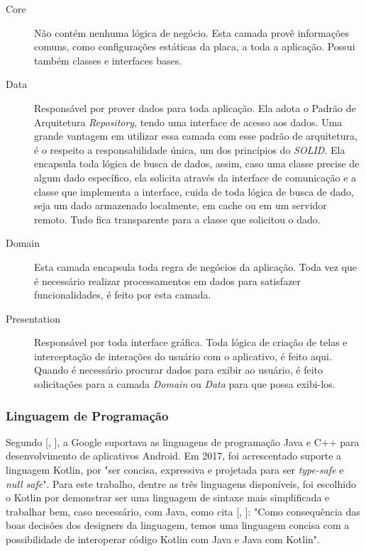 \documentclass[
	12pt,				%
	oneside,			%
	a4paper,			%
	brazil				%
]{abntex2}
\newcommand{\citecustom}[1]{[\citeauthoronline{#1}, \citeyear{#1}]}
\begin{document}
\begin{description}

\item[Core] Não contém nenhuma lógica de negócio. Esta camada provê informações comuns, como configurações estáticas da placa, a toda a aplicação. Possui também classes e interfaces bases.

\item[Data] Responsável por prover dados para toda aplicação. Ela adota o Padrão de Arquitetura \textit{Repository}, tendo uma interface de acesso aos dados. Uma grande vantagem em utilizar essa camada com esse padrão de arquitetura, é o respeito a responsabilidade única, um dos princípios do \textit{SOLID}. Ela encapsula toda lógica de busca de dados, assim, caso uma classe precise de algum dado específico, ela solicita através da interface de comunicação e a classe que implementa a interface, cuida de toda lógica de busca de dado, seja um dado armazenado localmente, em cache ou em um servidor remoto. Tudo fica transparente para a classe que solicitou o dado.

\item[Domain] Esta camada encapsula toda regra de negócios da aplicação. Toda vez que é necessário realizar processamentos em dados para satisfazer funcionalidades, é feito por esta camada.

\item[Presentation] Responsável por toda interface gráfica. Toda lógica de criação de telas e interceptação de interações do usuário com o aplicativo, é feito aqui. Quando é necessário procurar dados para exibir ao usuário, é feito solicitações para a camada \textit{Domain} ou \textit{Data} para que possa exibi-los.
 
\end{description}

\subsubsection{Linguagem de Programação}

Segundo \citecustom{Avram2017}, a Google suportava as linguagens de programação Java e C++ para desenvolvimento de aplicativos Android. Em 2017, foi acrescentado suporte a linguagem Kotlin, por "ser concisa, expressiva e projetada para ser \textit{type-safe} e \textit{null safe}".
Para este trabalho, dentre as três linguagens disponíveis, foi escolhido o Kotlin por demonstrar ser uma linguagem de sintaxe mais simplificada e trabalhar bem, caso necessário, com Java, como cita \citecustom{Kewerson2017}: "Como consequência das boas decisões dos designers da linguagem, temos uma linguagem concisa com a possibilidade de interoperar código Kotlin com Java e Java com Kotlin".
\end{document}
